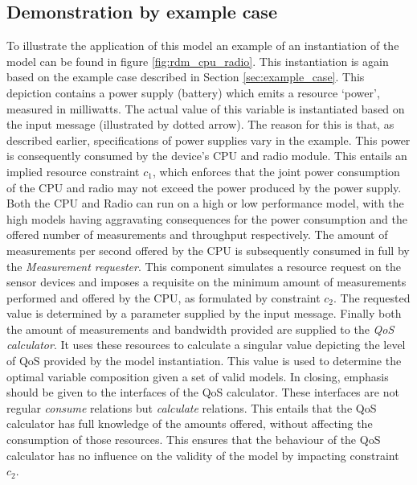 \subsection{Demonstration by example case}
To illustrate the application of this model an example of an instantiation of the model can be found in figure \ref{fig:rdm_cpu_radio}. This instantiation is again based on the example case described in Section \ref{sec:example_case}. This depiction contains a power supply (battery) which emits a resource `power', measured in milliwatts. The actual value of this variable is instantiated based on the input message (illustrated by dotted arrow). The reason for this is that, as described earlier, specifications of power supplies vary in the example. This power is consequently consumed by the device's CPU and radio module. This entails an implied resource constraint $c_1$, which enforces that the joint power consumption of the CPU and radio may not exceed the power produced by the power supply. Both the CPU and Radio can run on a high or low performance model, with the high models having aggravating consequences for the power consumption and the offered number of measurements and throughput respectively. The amount of measurements per second offered by the CPU is subsequently consumed in full by the \emph{Measurement requester}. This component simulates a resource request on the sensor devices and imposes a requisite on the minimum amount of measurements performed and offered by the CPU, as formulated by constraint $c_2$. The requested value is determined by a parameter supplied by the input message. Finally both the amount of measurements and bandwidth provided are supplied to the \emph{QoS calculator}. It uses these resources to calculate a singular value depicting the level of QoS provided by the model instantiation. This value is used to determine the optimal variable composition given a set of valid models. In closing, emphasis should be given to the interfaces of the QoS calculator. These interfaces are not regular \emph{consume} relations but \emph{calculate} relations. This entails that the QoS calculator has full knowledge of the amounts offered, without affecting the consumption of those resources. This ensures that the behaviour of the QoS calculator has no influence on the validity of the model by impacting constraint $c_2$.

